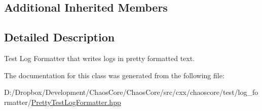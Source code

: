\subsection*{Additional Inherited Members}


\subsection{Detailed Description}
Test Log Formatter that writes logs in pretty formatted text. 

The documentation for this class was generated from the following file\+:\begin{DoxyCompactItemize}
\item 
D\+:/\+Dropbox/\+Development/\+Chaos\+Core/\+Chaos\+Core/src/cxx/chaoscore/test/log\+\_\+formatter/\hyperlink{_pretty_test_log_formatter_8hpp}{Pretty\+Test\+Log\+Formatter.\+hpp}\end{DoxyCompactItemize}
